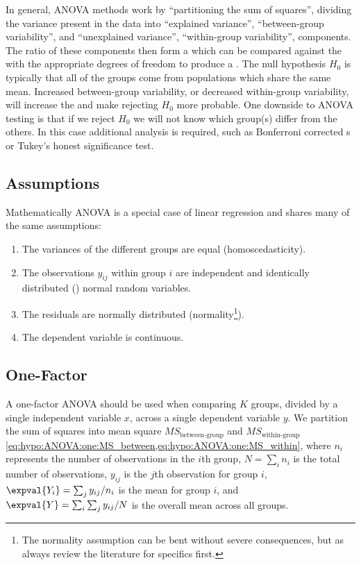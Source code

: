 In general, ANOVA methods work by ``partitioning the sum of squares'',
\ie dividing the variance present in the data into
``explained variance'', \ie ``between-group variability'',
and
``unexplained variance'', \ie ``within-group variability'',
components.
The ratio of these components then form a \Fstat
which can be compared against the \Fdist
with the appropriate degrees of freedom to produce a \pvalue.
The null hypothesis $H_{0}$ is typically that all of the groups come from populations which share the same mean.
Increased between-group variability, or decreased within-group variability,
will increase the \Fstat and make rejecting $H_{0}$ more probable.
One downside to ANOVA testing is that if we reject $H_{0}$
we will not know which group(s) differ from the others.
In this case additional \posthoc analysis is required,
such as Bonferroni corrected {\ttest}s or Tukey's honest significance test.

\subsection{Assumptions}
\label{hypo:ANOVA:assumptions}

Mathematically ANOVA is a special case of linear regression
and shares many of the same assumptions:

\begin{enumerate}[noitemsep]
  \item The variances of the different groups are equal (homoscedasticity).
  \item The observations $y_{ij}$ within group $i$ are independent and identically distributed (\iid) normal random variables.
  \item The residuals are normally distributed (normality\footnote{The normality assumption can be bent without severe consequences, but as always review the literature for specifics first.}).
  \item The dependent variable is continuous.
\end{enumerate}

\subsection{One-Factor}
\label{hypo:ANOVA:one}

A one-factor ANOVA should be used when comparing $K$ groups,
divided by a single independent variable $x$,
across a single dependent variable $y$.
We partition the sum of squares into
mean square $MS_{\text{between-group}}$ and $MS_{\text{within-group}}$
\cref{eq:hypo:ANOVA:one:MS_between,eq:hypo:ANOVA:one:MS_within}, where
$n_{i}$ represents the number of observations in the $i$th group,
$N = \sum_{i} n_{i}$ is the total number of observations,
$y_{ij}$ is the $j$th observation for group $i$,
$\expval{Y_{i}} = \sum_{j} y_{ij} / n_{i}$ is the mean for group $i$,
and $\expval{Y} = \sum_{i}\sum_{j} y_{ij} / N$ is the overall mean across all groups.

